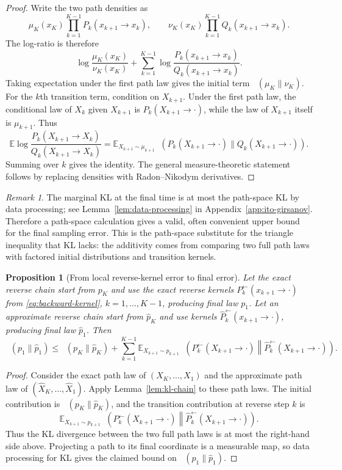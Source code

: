\documentclass{amsart}
\numberwithin{equation}{section}
\theoremstyle{plain}
\newtheorem{prop}[theorem]{Proposition}
\theoremstyle{definition}
\theoremstyle{remark}
\newtheorem*{remark}{Remark}
\DeclareMathOperator{\KL}{D_{\mathsf{KL}}}
\newcommand{\E}{\mathbb{E}}
\newcommand{\wh}[1]{\widehat{#1}}
\begin{document}
\begin{proof}
Write the two path densities as
\[
    \mu_K(x_K)\prod_{k=1}^{K-1}P_k(x_{k+1} \to x_k),
    \qquad
    \nu_K(x_K)\prod_{k=1}^{K-1}Q_k(x_{k+1} \to x_k).
\]
The log-ratio is therefore
\[
    \log\frac{\mu_K(x_K)}{\nu_K(x_K)}
    +
    \sum_{k=1}^{K-1}
    \log\frac{P_k(x_{k+1} \to x_k)}{Q_k(x_{k+1} \to x_k)}.
\]
Taking expectation under the first path law gives the initial term
$\KL(\mu_K\|\nu_K)$.  For the $k$th transition term, condition on
$X_{k+1}$.  Under the first path law, the conditional law of $X_k$ given
$X_{k+1}$ is $P_k(X_{k+1} \to \cdot)$, while the law of $X_{k+1}$ itself is
$\mu_{k+1}$.  Thus
\[
    \E
    \log\frac{P_k(X_{k+1} \to X_k)}{Q_k(X_{k+1} \to X_k)}
    =
    \E_{X_{k+1}\sim\mu_{k+1}}
    \KL(P_k(X_{k+1} \to \cdot)\|Q_k(X_{k+1} \to \cdot)).
\]
Summing over $k$ gives the identity.  The general measure-theoretic statement
follows by replacing densities with Radon--Nikodym derivatives.
\end{proof}

\begin{remark}
The marginal KL at the final time is at most the path-space KL by data
processing; see Lemma~\ref{lem:data-processing} in Appendix~\ref{app:ito-girsanov}.
Therefore a path-space calculation gives a valid, often convenient upper bound
for the final sampling error.  This is the path-space substitute for the triangle
inequality that KL lacks: the additivity comes from comparing two full path laws
with factored initial distributions and transition kernels.
\end{remark}

\begin{prop}[From local reverse-kernel error to final error]
\label{prop:local-to-global}
Let the exact reverse chain start from $p_K$ and use the exact reverse kernels
$P_k^{\leftarrow}(x_{k+1} \to \cdot)$ from \eqref{eq:backward-kernel},
$k=1,\ldots,K-1$, producing final law $p_1$.
Let an approximate reverse chain start from $\wh p_K$ and use kernels
$\wh P_k^{\leftarrow}(x_{k+1} \to \cdot)$, producing final law $\wh p_1$.  Then
\[
    \KL(p_1\|\wh p_1)
    \leq
    \KL(p_K\|\wh p_K)
    +
    \sum_{k=1}^{K-1}
    \E_{X_{k+1}\sim p_{k+1}}
    \KL\!\left(
        P_k^{\leftarrow}(X_{k+1} \to \cdot)
        \middle\|
        \wh P_k^{\leftarrow}(X_{k+1} \to \cdot)
    \right).
\]
\end{prop}

\begin{proof}
Consider the exact path law of $(X_K,\ldots,X_1)$ and the approximate path law
of $(\wh X_K,\ldots,\wh X_1)$.  Apply Lemma~\ref{lem:kl-chain} to these path
laws.
The initial contribution is $\KL(p_K\|\wh p_K)$, and the transition
contribution at reverse step $k$ is
\[
    \E_{X_{k+1}\sim p_{k+1}}
    \KL\!\left(
        P_k^{\leftarrow}(X_{k+1} \to \cdot)
        \middle\|
        \wh P_k^{\leftarrow}(X_{k+1} \to \cdot)
    \right).
\]
Thus the KL divergence between the two full path laws is at most the right-hand
side above.  Projecting a path to its final coordinate is a measurable map, so
data processing for KL gives the claimed bound on $\KL(p_1\|\wh p_1)$.
\end{proof}
\end{document}
